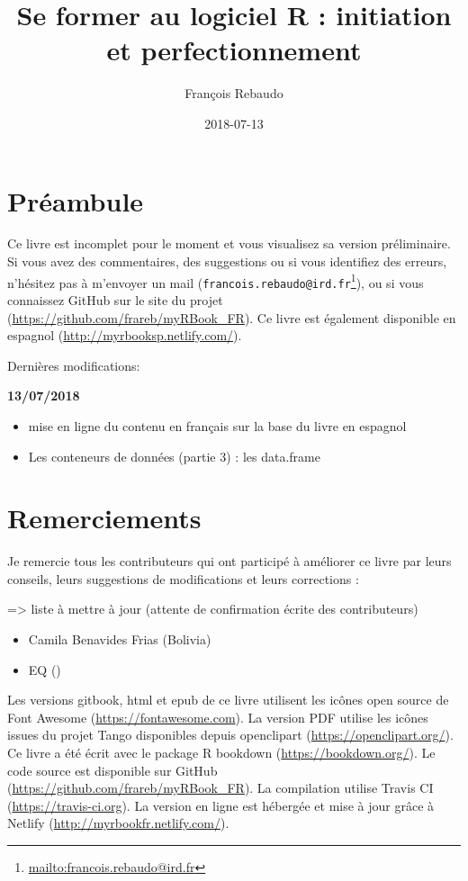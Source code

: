 \documentclass[]{book}
\title{Se former au logiciel R : initiation et perfectionnement}
\author{François Rebaudo}
\date{2018-07-13}
\providecommand{\tightlist}{%
  \setlength{\itemsep}{0pt}\setlength{\parskip}{0pt}}
\let\rmarkdownfootnote\footnote%
\def\footnote{\protect\rmarkdownfootnote}
\renewcommand{\href}[2]{#2\footnote{\url{#1}}}
\begin{document}
\maketitle

{
\setcounter{tocdepth}{1}
\tableofcontents
}
\chapter{Préambule}\label{preambule}

Ce livre est incomplet pour le moment et vous visualisez sa version
préliminaire. Si vous avez des commentaires, des suggestions ou si vous
identifiez des erreurs, n'hésitez pas à m'envoyer un mail
(\href{mailto:francois.rebaudo@ird.fr}{\nolinkurl{francois.rebaudo@ird.fr}}),
ou si vous connaissez GitHub sur le site du projet
(\url{https://github.com/frareb/myRBook_FR}). Ce livre est également
disponible en espagnol (\url{http://myrbooksp.netlify.com/}).

Dernières modifications:

\textbf{13/07/2018}

\begin{itemize}
\tightlist
\item
  mise en ligne du contenu en français sur la base du livre en espagnol
\item
  Les conteneurs de données (partie 3) : les data.frame
\end{itemize}

\chapter{Remerciements}\label{remerciements}

Je remercie tous les contributeurs qui ont participé à améliorer ce
livre par leurs conseils, leurs suggestions de modifications et leurs
corrections :

=\textgreater{} liste à mettre à jour (attente de confirmation écrite
des contributeurs)

\begin{itemize}
\tightlist
\item
  Camila Benavides Frias (Bolivia)
\item
  EQ ()
\end{itemize}

Les versions gitbook, html et epub de ce livre utilisent les icônes open
source de Font Awesome (\url{https://fontawesome.com}). La version PDF
utilise les icônes issues du projet Tango disponibles depuis openclipart
(\url{https://openclipart.org/}). Ce livre a été écrit avec le package R
bookdown (\url{https://bookdown.org/}). Le code source est disponible
sur GitHub (\url{https://github.com/frareb/myRBook_FR}). La compilation
utilise Travis CI (\url{https://travis-ci.org}). La version en ligne est
hébergée et mise à jour grâce à Netlify
(\url{http://myrbookfr.netlify.com/}).
\end{document}
